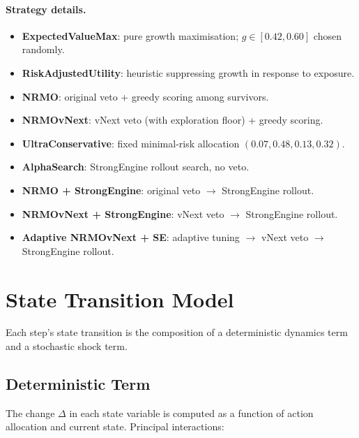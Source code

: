 \paragraph{Strategy details.}

\begin{itemize}
\item \textbf{ExpectedValueMax}: pure growth maximisation; $g \in
[0.42, 0.60]$ chosen randomly.
\item \textbf{RiskAdjustedUtility}: heuristic suppressing growth in
response to exposure.
\item \textbf{NRMO}: original veto + greedy scoring among survivors.
\item \textbf{NRMOvNext}: vNext veto (with exploration floor) +
greedy scoring.
\item \textbf{UltraConservative}: fixed minimal-risk allocation
$(0.07, 0.48, 0.13, 0.32)$.
\item \textbf{AlphaSearch}: StrongEngine rollout search, no veto.
\item \textbf{NRMO + StrongEngine}: original veto $\to$ StrongEngine
rollout.
\item \textbf{NRMOvNext + StrongEngine}: vNext veto $\to$
StrongEngine rollout.
\item \textbf{Adaptive NRMOvNext + SE}: adaptive tuning $\to$ vNext
veto $\to$ StrongEngine rollout.
\end{itemize}

\section{State Transition Model}
\label{sec:vnext-transition-model}

Each step's state transition is the composition of a deterministic
dynamics term and a stochastic shock term.

\subsection{Deterministic Term}
\label{sec:vnext-deterministic}

The change $\Delta$ in each state variable is computed as a function
of action allocation and current state. Principal interactions:

